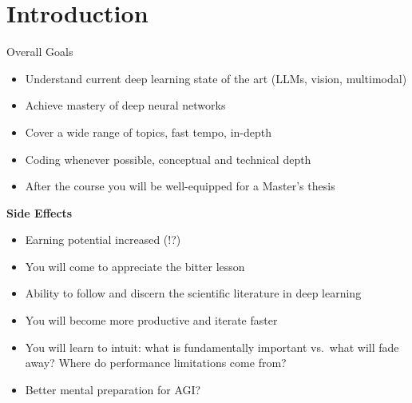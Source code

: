 
\section{Introduction}

\begin{frame}{Overall Goals}
  \begin{itemize}
    \item Understand current deep learning state of the art (LLMs, vision, multimodal)
    \item Achieve mastery of deep neural networks
    \item Cover a wide range of topics, fast tempo, in-depth
    \item Coding whenever possible, conceptual and technical depth
    \item After the course you will be well-equipped for a Master's thesis
  \end{itemize}

  \vspace{1em}
  \textbf{Side Effects}
  \begin{itemize}
    \item Earning potential increased (!?)
    \item You will come to appreciate the bitter lesson~\cite{sutton2019bitter}
    \item Ability to follow and discern the scientific literature in deep learning
    \item You will become more productive and iterate faster
    \item You will learn to intuit: what is fundamentally important vs.\ what will fade away?
      Where do performance limitations come from?
    \item Better mental preparation for AGI?
  \end{itemize}
\end{frame}

